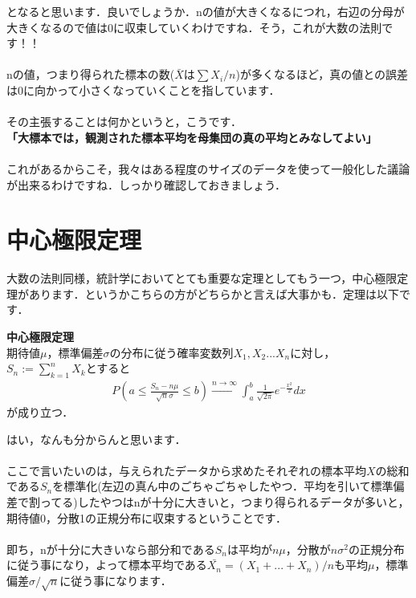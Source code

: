 \documentclass[11pt,a4paper,uplatex]{ujreport} 	%
\begin{document}
となると思います．良いでしょうか．nの値が大きくなるにつれ，右辺の分母が大きくなるので値は0に収束していくわけですね．そう，これが大数の法則です！！\\
\\

nの値，つまり得られた標本の数($\bar{X}は\sum X_i/n$)が多くなるほど，真の値との誤差は0に向かって小さくなっていくことを指しています．\\\\

その主張することは何かというと，こうです．\\

\textbf{「大標本では，観測された標本平均を母集団の真の平均とみなしてよい」}\\
\\

これがあるからこそ，我々はある程度のサイズのデータを使って一般化した議論が出来るわけですね．しっかり確認しておきましょう．


\section{中心極限定理}
大数の法則同様，統計学においてとても重要な定理としてもう一つ，中心極限定理があります．というかこちらの方がどちらかと言えば大事かも．定理は以下です．\\

\begin{screen}
  \textbf{中心極限定理}\\
  期待値$\mu$，標準偏差$\sigma$の分布に従う確率変数列$X_1,X_2...X_n$に対し，$S_n := \sum_{k=1}^n X_k$とすると
  \begin{align}
    P(a \leq \frac{S_n -n\mu}{\sqrt{n}\sigma} \leq b) \xrightarrow{n\rightarrow\infty} \int_a^b \frac{1}{\sqrt{2\pi}}e^{-\frac{x^2}{2}}dx
  \end{align}
  が成り立つ．
\end{screen}

はい，なんも分からんと思います．\\
\\

ここで言いたいのは，与えられたデータから求めたそれぞれの標本平均$X$の総和である$S_n$を標準化(左辺の真ん中のごちゃごちゃしたやつ．平均を引いて標準偏差で割ってる)したやつはnが十分に大きいと，つまり得られるデータが多いと，期待値0，分散1の正規分布に収束するということです．\\
\\

即ち，nが十分に大きいなら部分和である$S_n$は平均が$n\mu$，分散が$n\sigma^2$の正規分布に従う事になり，よって標本平均である$\bar{X_n}=(X_1+...+X_n)/n$も平均$\mu$，標準偏差$\sigma/\sqrt{n}$に従う事になります．\\
\\
\end{document}
